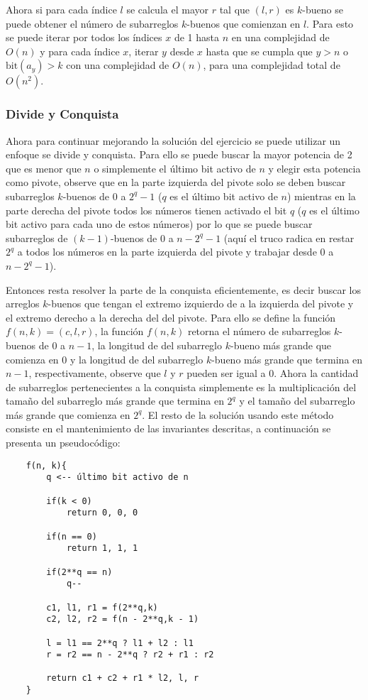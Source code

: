\documentclass{article}
\begin{document}
Ahora si para cada índice $l$ se calcula el mayor $r$ tal que $(l,r)$ es $k$-bueno se puede obtener el número de subarreglos $k$-buenos
que comienzan en $l$. Para esto se puede iterar por todos los índices $x$ de 1 hasta $n$ en una complejidad de $O(n)$ y para cada
índice $x$, iterar $y$ desde $x$ hasta que se cumpla que $y>n$ o $\text{bit}(a_y)>k$ con una complejidad de $O(n)$, para una complejidad
total de $O(n^2)$.

\subsubsection{Divide y Conquista}

Ahora para continuar mejorando la solución del ejercicio se puede utilizar un enfoque se divide y conquista. Para ello se puede
buscar la mayor potencia de 2 que es menor que $n$ o simplemente el último bit activo de $n$ y elegir esta potencia como pivote,
observe que en la parte izquierda del pivote solo se deben buscar subarreglos $k$-buenos de 0 a $2^q-1$ ($q$ es el último bit activo de $n$)
mientras en la parte derecha del pivote todos los números tienen activado el bit $q$ ($q$ es el último bit activo para cada uno de
estos números) por lo que se puede buscar subarreglos de $(k-1)$-buenos de 0 a $n-2^q-1$ (aquí el truco radica en restar $2^q$ a todos los
números en la parte izquierda del pivote y trabajar desde 0 a $n-2^q-1$).

Entonces resta resolver la parte de la conquista eficientemente, es decir buscar los arreglos $k$-buenos que tengan el extremo
izquierdo de a la izquierda del pivote y el extremo derecho a la derecha del del pivote. Para ello se define la función $f(n,k)=(c,l,r)$,
la función $f(n,k)$ retorna el número de subarreglos $k$-buenos de 0 a $n-1$, la longitud de del subarreglo $k$-bueno más grande
que comienza en 0 y la longitud de del subarreglo $k$-bueno más grande que termina en $n-1$, respectivamente, observe que $l$ y $r$ pueden
ser igual a 0. Ahora la cantidad de subarreglos pertenecientes a la conquista simplemente es la multiplicación del tamaño del
subarreglo más grande que termina en $2^q$ y el tamaño del subarreglo más grande que comienza en $2^q$. El resto de la solución
usando este método consiste en el mantenimiento de las invariantes descritas, a continuación se presenta un pseudocódigo:

\begin{verbatim}
    f(n, k){
        q <-- último bit activo de n 

        if(k < 0)
            return 0, 0, 0

        if(n == 0)
            return 1, 1, 1

        if(2**q == n) 
            q--

        c1, l1, r1 = f(2**q,k)
        c2, l2, r2 = f(n - 2**q,k - 1)

        l = l1 == 2**q ? l1 + l2 : l1
        r = r2 == n - 2**q ? r2 + r1 : r2

        return c1 + c2 + r1 * l2, l, r 
    }
\end{verbatim}
\end{document}
